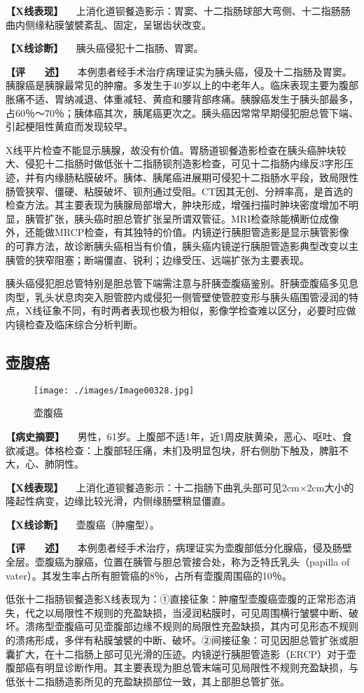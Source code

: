 \textbf{【X线表现】}
　上消化道钡餐造影示：胃窦、十二指肠球部大弯侧、十二指肠肠曲内侧缘粘膜皱襞紊乱、固定，呈锯齿状改变。

\textbf{【X线诊断】} 　胰头癌侵犯十二指肠、胃窦。

\textbf{【评　　述】}
　本例患者经手术治疗病理证实为胰头癌，侵及十二指肠及胃窦。胰腺癌是胰腺最常见的肿瘤。多发生于40岁以上的中老年人。临床表现主要为腹部胀痛不适、胃纳减退、体重减轻、黄疸和腰背部疼痛。胰腺癌发生于胰头部最多，占60％～70％；胰体癌其次，胰尾癌更次之。胰头癌因常常早期侵犯胆总管下端、引起梗阻性黄疸而发现较早。

X线平片检查不能显示胰腺，故没有价值。胃肠道钡餐造影检查在胰头癌肿块较大、侵犯十二指肠时做低张十二指肠钡剂造影检查，可见十二指肠内缘反3字形压迹，并有内缘肠粘膜破坏。胰体、胰尾癌进展期可侵犯十二指肠水平段，致局限性肠管狭窄、僵硬、粘膜破坏、钡剂通过受阻。CT因其无创、分辨率高，是首选的检查方法。其主要表现为胰腺局部增大，肿块形成，增强扫描时肿块密度增加不明显，胰管扩张，胰头癌时胆总管扩张呈所谓双管征。MRI检查除能横断位成像外，还能做MRCP检查，有其独特的价值。内镜逆行胰胆管造影是显示胰管影像的可靠方法，故诊断胰头癌相当有价值，胰头癌内镜逆行胰胆管造影典型改变以主胰管的狭窄阻塞；断端僵直、锐利；边缘受压、远端扩张为主要表现。

胰头癌侵犯胆总管特别是胆总管下端需注意与肝胰壶腹癌鉴别。肝胰壶腹癌多见息肉型，乳头状息肉突入胆管腔内或侵犯一侧管壁使管腔变形与胰头癌围管浸润的特点，X线征象不同，有时两者表现也极为相似，影像学检查难以区分，必要时应做内镜检查及临床综合分析判断。

\subsection{壶腹癌}

\begin{figure}[!htbp]
 \centering
 \texttt{[image: ./images/Image00328.jpg]}
 \captionsetup{justification=centering}
 \caption{壶腹癌}
 \label{fig5-9-3}
  \end{figure} 

\textbf{【病史摘要】}
　男性，61岁。上腹部不适1年，近1周皮肤黄染，恶心、呕吐、食欲减退。体格检查：上腹部轻压痛，未扪及明显包块，肝右侧肋下触及，脾脏不大，心、肺阴性。

\textbf{【X线表现】}
　上消化道钡餐造影示：十二指肠下曲乳头部可见2cm×2cm大小的隆起性病变，边缘比较光滑，内侧缘肠壁稍显僵直。

\textbf{【X线诊断】} 　壶腹癌（肿瘤型）。

\textbf{【评　　述】}
　本例患者经手术治疗，病理证实为壶腹部低分化腺癌，侵及肠壁全层。壶腹癌为腺癌，位置在胰管与胆总管接合处，称为乏特氏乳头（papilla
of vater）。其发生率占所有胆管癌的8％，占所有壶腹周围癌的10％。

低张十二指肠钡餐造影X线表现为：①直接征象：肿瘤型壶腹癌壶腹的正常形态消失，代之以局限性不规则的充盈缺损，当浸润粘膜时，可见周围横行皱襞中断、破坏。溃疡型壶腹癌可见壶腹部边缘不规则的局限性充盈缺损，其内可见形态不规则的溃疡形成，多伴有粘膜皱襞的中断、破坏。②间接征象：可见因胆总管扩张或胆囊扩大，在十二指肠上部可见光滑的压迹。内镜逆行胰胆管造影（ERCP）对于壶腹部癌有明显诊断作用。其主要表现为胆总管末端可见局限性不规则充盈缺损，与低张十二指肠造影所见的充盈缺损部位一致，其上部胆总管扩张。

\protect\hypertarget{text00011.html}{}{}

